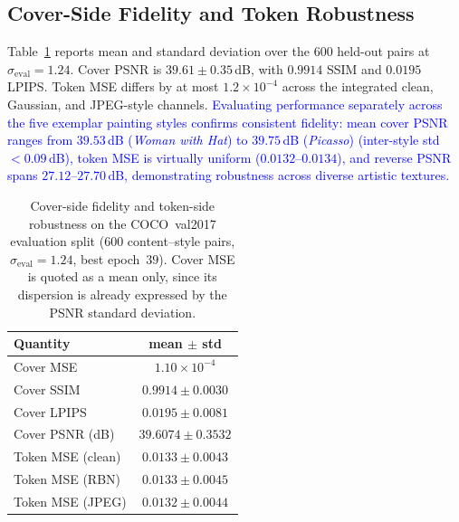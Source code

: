 \documentclass[runningheads]{llncs}
\newcommand{\revised}[1]{\textcolor{blue}{#1}}
\begin{document}
\subsection{Cover-Side Fidelity and Token Robustness}
\label{sec:exp_coco}
Table~\ref{tab:cover} reports mean and standard deviation over the $600$ held-out pairs at $\sigma_{\text{eval}}=1.24$. Cover PSNR is $39.61\pm0.35$\,dB, with $0.9914$ SSIM and $0.0195$ LPIPS. Token MSE differs by at most $1.2\!\times\!10^{-4}$ across the integrated clean, Gaussian, and JPEG-style channels. \revised{Evaluating performance separately across the five exemplar painting styles confirms consistent fidelity: mean cover PSNR ranges from $39.53$\,dB (\emph{Woman with Hat}) to $39.75$\,dB (\emph{Picasso}) (inter-style std $<0.09$\,dB), token MSE is virtually uniform ($0.0132$--$0.0134$), and reverse PSNR spans $27.12$--$27.70$\,dB, demonstrating robustness across diverse artistic textures.}

\begin{table}[htbp]
\centering
\scriptsize
\caption{Cover-side fidelity and token-side robustness on the COCO~val2017 evaluation split ($600$ content--style pairs, $\sigma_{\text{eval}}=1.24$, best epoch~$39$). Cover MSE is quoted as a mean only, since its dispersion is already expressed by the PSNR standard deviation.}
\label{tab:cover}
\setlength{\tabcolsep}{8pt}
\begin{tabular}{l c}
\toprule
\textbf{Quantity} & \textbf{mean $\pm$ std} \\
\midrule
Cover MSE         & $1.10\!\times\!10^{-4}$ \\
Cover SSIM        & $0.9914 \pm 0.0030$ \\
Cover LPIPS       & $0.0195 \pm 0.0081$ \\
Cover PSNR (dB)   & $39.6074 \pm 0.3532$ \\
\midrule
Token MSE (clean) & $0.0133 \pm 0.0043$ \\
Token MSE (RBN)   & $0.0133 \pm 0.0045$ \\
Token MSE (JPEG)  & $0.0132 \pm 0.0044$ \\
\bottomrule
\end{tabular}
\end{table}
\end{document}
